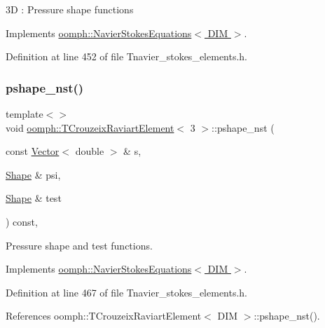 3D \+: Pressure shape functions 

Implements \hyperlink{classoomph_1_1NavierStokesEquations_a487030303b71da299aed3d4639a022ab}{oomph\+::\+Navier\+Stokes\+Equations$<$ D\+I\+M $>$}.



Definition at line 452 of file Tnavier\+\_\+stokes\+\_\+elements.\+h.

\mbox{\label{classoomph_1_1TCrouzeixRaviartElement_a0d100edb0d0d192db74418881765fa73}} 
\subsubsection{\texorpdfstring{pshape\+\_\+nst()}{pshape\_nst()}\hspace{0.1cm}{\footnotesize\ttfamily [6/6]}}
{\footnotesize\ttfamily template$<$$>$ \\
void \hyperlink{classoomph_1_1TCrouzeixRaviartElement}{oomph\+::\+T\+Crouzeix\+Raviart\+Element}$<$ 3 $>$\+::pshape\+\_\+nst (\begin{DoxyParamCaption}\item[{const \hyperlink{classoomph_1_1Vector}{Vector}$<$ double $>$ \&}]{s,  }\item[{\hyperlink{classoomph_1_1Shape}{Shape} \&}]{psi,  }\item[{\hyperlink{classoomph_1_1Shape}{Shape} \&}]{test }\end{DoxyParamCaption}) const\hspace{0.3cm}{\ttfamily [inline]}, {\ttfamily [virtual]}}



Pressure shape and test functions. 



Implements \hyperlink{classoomph_1_1NavierStokesEquations_a55f96a5c9f985476aeb145f683d63001}{oomph\+::\+Navier\+Stokes\+Equations$<$ D\+I\+M $>$}.



Definition at line 467 of file Tnavier\+\_\+stokes\+\_\+elements.\+h.



References oomph\+::\+T\+Crouzeix\+Raviart\+Element$<$ D\+I\+M $>$\+::pshape\+\_\+nst().

